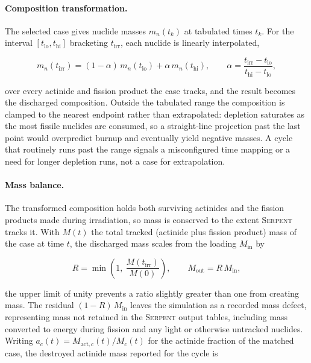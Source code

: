 \paragraph{Composition transformation.}
\label{subsec:ads-discharge}
The selected case gives nuclide masses $m_n(t_k)$ at tabulated times $t_k$. For
the interval $[t_{\mathrm{lo}}, t_{\mathrm{hi}}]$ bracketing $t_{\mathrm{irr}}$,
each nuclide is linearly interpolated,

\begin{equation}
    m_n(t_{\mathrm{irr}}) = (1-\alpha)\,m_n(t_{\mathrm{lo}})
                          + \alpha\,m_n(t_{\mathrm{hi}}),
    \qquad
    \alpha = \frac{t_{\mathrm{irr}} - t_{\mathrm{lo}}}
                  {t_{\mathrm{hi}} - t_{\mathrm{lo}}},
    \label{eq:ads-interp}
\end{equation}

over every actinide and fission product the case tracks, and the result becomes
the discharged composition. Outside the tabulated range the composition is clamped
to the nearest endpoint rather than extrapolated: depletion saturates as the most
fissile nuclides are consumed, so a straight-line projection past the last point
would overpredict burnup and eventually yield negative masses. A cycle that
routinely runs past the range signals a misconfigured time mapping or a need for
longer depletion runs, not a case for extrapolation.

\paragraph{Mass balance.}
The transformed composition holds both surviving actinides and the fission
products made during irradiation, so mass is conserved to the extent
\textsc{Serpent} tracks it. With $M(t)$ the total tracked (actinide plus
fission product) mass of the case at time $t$, the discharged mass scales from the
loading $M_{\mathrm{in}}$ by

\begin{equation}
    R = \min\!\left(1,\ \frac{M(t_{\mathrm{irr}})}{M(0)}\right),
    \qquad
    M_{\mathrm{out}} = R\,M_{\mathrm{in}},
    \label{eq:ads-ratio}
\end{equation}

the upper limit of unity prevents a ratio slightly greater than one from
creating mass. The residual $(1-R)\,M_{\mathrm{in}}$ leaves the simulation as a
recorded mass defect, representing mass not retained in the \textsc{Serpent} output
tables, including mass converted to energy during fission and any light or
otherwise untracked nuclides. Writing
$a_c(t) = M_{\mathrm{act},c}(t)/M_c(t)$ for the actinide fraction
of the matched case, the destroyed actinide mass reported for the cycle is

